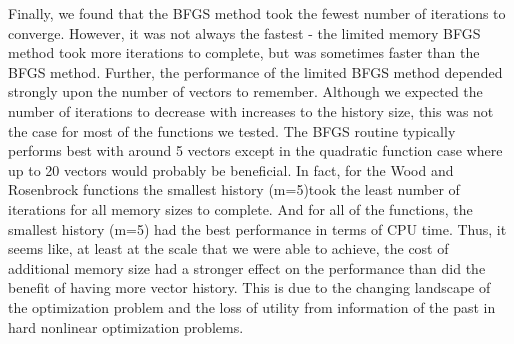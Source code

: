 \documentclass[12pt]{amsart}
\begin{document}
Finally, we found that the BFGS method took the fewest number of iterations to converge. However, it was not always the fastest - the limited memory BFGS method took more iterations to complete, but was sometimes faster than the BFGS method. Further, the performance of the limited BFGS method depended strongly upon the number of vectors to remember. Although we expected the number of iterations to decrease with increases to the history size, this was not the case for most of the functions we tested.  The BFGS routine typically performs best with around 5 vectors except in the quadratic function case where up to 20 vectors would probably be beneficial. In fact, for the Wood and Rosenbrock functions the smallest history (m=5)took the least number of iterations for all memory sizes to complete.  And for all of the functions, the smallest history (m=5) had the best performance in terms of CPU time.  Thus, it seems like, at least at the scale that we were able to achieve, the cost of additional memory size had a stronger effect on the performance than did the benefit of having more vector history.  This is due to the changing landscape of the optimization problem and the loss of utility from information of the past in hard nonlinear optimization problems.
\end{document}
